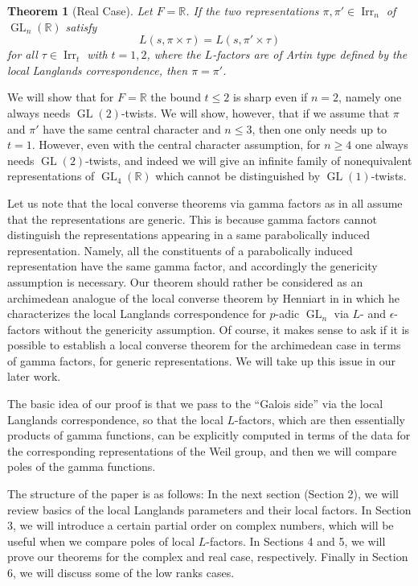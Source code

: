 \documentclass[11pt]{amsart}
\theoremstyle{plain}
\newtheorem*{Thm*}{Theorem}
\theoremstyle{definition}
\numberwithin{equation}{section}
\newcommand{\R}{\mathbb{R}}
\newcommand{\Irr}{\operatorname{Irr}}
\newcommand{\GL}{\operatorname{GL}}
\begin{document}
\begin{Thm*}[Real Case]
Let $F=\R$. If the two representations $\pi, \pi'\in\Irr_n$ of $\GL_n(\R)$ satisfy
\[
L(s, \pi\times\tau)=L(s, \pi'\times\tau)
\]
for all $\tau\in\Irr_t$ with $t=1, 2$, where the $L$-factors are
of Artin type defined by the local Langlands correspondence, then $\pi=\pi'$. 
\end{Thm*}

We will show that for $F=\R$ the bound $t\leq 2$ is sharp even
if $n=2$, namely one always needs $\GL(2)$-twists. We will show,
however, that if we assume that $\pi$ and $\pi'$ have the same
central character and $n\leq 3$, then one only needs up to
$t=1$. However, even with the central character assumption, for
$n\geq 4$ one always needs $\GL(2)$-twists, and indeed we will give an
infinite family of nonequivalent representations of $\GL_4(\R)$ which cannot be
distinguished by $\GL(1)$-twists.

Let us note that the local converse theorems via gamma factors as in
\cite{Henniart1, Chen, Chai, JL} all assume that the representations
are generic. This is because gamma factors cannot distinguish the
representations appearing in a same parabolically
induced representation. Namely, all the constituents of a parabolically
induced representation have the same gamma factor, and accordingly the
genericity assumption is necessary. Our theorem should rather be
considered as an archimedean analogue of the local converse theorem by
Henniart in \cite{Henniart2} in which he characterizes the local
Langlands correspondence for $p$-adic $\GL_n$ via $L$- and
$\epsilon$-factors without the genericity assumption. Of course, it
makes sense to ask if it is possible to establish a local converse
theorem for the archimedean case in terms of gamma factors, for generic
representations. We will take up this issue in our later work.


The basic idea of our proof is that we pass to the ``Galois side'' via
the local Langlands correspondence, so that
the local $L$-factors, which are then essentially products of gamma
functions, can be explicitly computed in terms of the data for the
corresponding representations of the Weil group, and then we will
compare poles of the gamma functions.

The structure of the paper is as follows: In the next section (Section
2), we will review basics of the local Langlands parameters and their
local factors. In Section 3, we will
introduce a certain partial order on complex numbers, which will be
useful when we compare poles of local $L$-factors. In Sections 4 and 5,
we will prove our theorems for the complex and real case,
respectively. Finally in Section 6, we will discuss some of the low
ranks cases.
\end{document}
